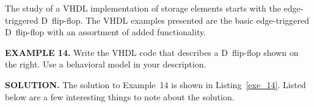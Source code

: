 The study of a VHDL implementation of storage elements starts with the edge-triggered D~flip-flop. The VHDL examples presented are the basic edge-triggered D~flip-flop with an assortment of added functionality. 
\begin{leftbar}
\begin{minipage}{0.5\linewidth}
\noindent
\textbf{EXAMPLE 14.}
Write the VHDL code that describes a D~flip-flop shown on the right. Use a behavioral model in your description.
\end{minipage}
\begin{minipage}{0.47\linewidth}
\begin{flushright}
\end{flushright}
\end{minipage}
\end{leftbar}
\noindent
\textbf{SOLUTION.} The solution to Example~14 is shown in Listing~\ref{exe_14}. Listed below are a few interesting things to note about the solution.
